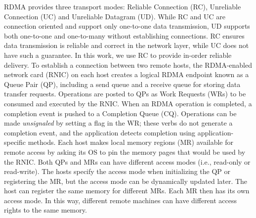 RDMA provides three transport modes: Reliable Connection (RC), Unreliable Connection (UC) and Unreliable Datagram (UD). 
While RC and UC are connection oriented and support only one-to-one data transmission, UD supports both one-to-one and one-to-many without establishing connections.
RC ensures data transmission is reliable and correct in the network layer, while UC does not have such a guarantee.
In this work, we use RC to provide in-order reliable delivery.
To establish a connection between two remote hosts, the RDMA-enabled network card (RNIC) on each host creates a logical RDMA endpoint known as a Queue Pair (QP), including a send queue and a receive queue for storing data transfer requests. 
Operations are posted to QPs as Work Requests (WRs) to be consumed and executed by the RNIC. 
When an RDMA operation is completed, a completion event is pushed to a Completion Queue (CQ).
Operations can be made \emph{unsignaled} by setting a flag in the WR; these verbs do not generate a completion event, and the application detects completion using application-specific methods.
Each host makes local memory regions (MR) available for remote access by asking its OS to pin the memory pages that would be used by the RNIC.
Both QPs and MRs can have different access modes (i.e., read-only or read-write). 
The hosts specify the access mode when initializing the QP or registering the MR, but the access mode can be dynamically updated later. 
The host can register the same memory for different MRs. Each MR then has its own access mode.
In this way, different remote machines can have different access rights to the same memory. 
